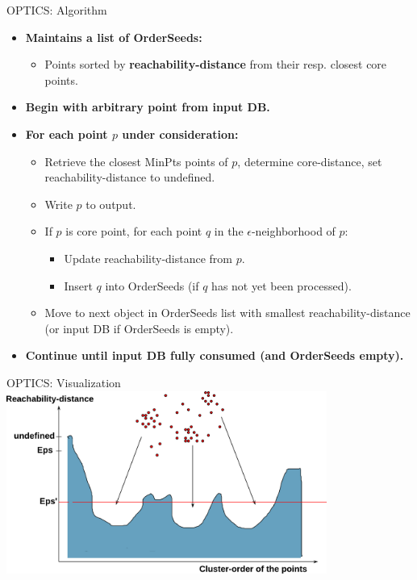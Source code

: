 \begin{frame}{OPTICS: Algorithm}
	\begin{itemize}
		\item \textbf{Maintains a list of {\color{airforceblue}OrderSeeds}:}
		\begin{itemize}
			\item Points sorted by \textbf{reachability-distance} from their 
			resp. closest core points.
		\end{itemize}
		\item \textbf{Begin with arbitrary point from input DB.}
		\item \textbf{For each point $p$ under consideration:}
		\begin{itemize}
			\item Retrieve the closest MinPts points of $p$, determine 
			core-distance, set reachability-distance to undefined.
			\item Write $p$ to output.
			\item If $p$ is core point, for each point $q$ in the 
			$\epsilon$-neighborhood of $p$:
			\begin{itemize}
				\item Update reachability-distance from $p$.
				\item Insert $q$ into OrderSeeds (if $q$ has not yet been 
				processed).
			\end{itemize}
			\item Move to next object in OrderSeeds list with smallest 
			reachability-distance (or input DB if OrderSeeds is empty).
		\end{itemize}
		\item \textbf{Continue until input DB fully consumed (and OrderSeeds 
		empty).}
	\end{itemize}
\end{frame}

\begin{frame}{OPTICS: Visualization}
	\centering
	\includegraphics[width=10.5cm]{img/clusterdensity.pdf}
\end{frame}

